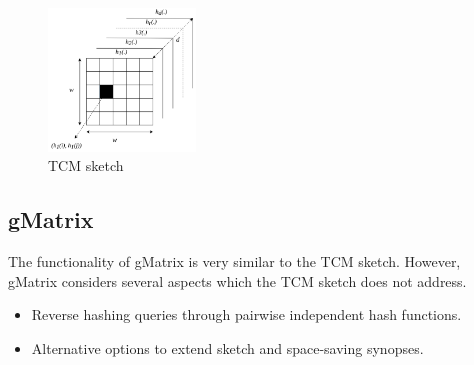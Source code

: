 \begin{figure}[htbp]
    \centerline{\includegraphics[width=0.35\textwidth]{img/tcm.png}}
    \caption{TCM sketch\cite{khan_query-friendly_2016}}
    \label{fig:tcm}
\end{figure}

\subsection{gMatrix}

The functionality of gMatrix\cite{khan_query-friendly_2016} is very similar to the TCM sketch. However, gMatrix considers several aspects which the TCM sketch does not address.

\begin{itemize}
    \item Reverse hashing queries through pairwise independent hash functions.
    \item Alternative options to extend sketch and space-saving synopses.
\end{itemize}
